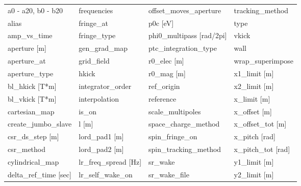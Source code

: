  \begin{tabular}{llll} \toprule
a0 - a20, b0 - b20               & frequencies                      & offset_moves_aperture            & tracking_method                  \\
alias                            & fringe_at                        & p0c [eV]                         & type                             \\
amp_vs_time                      & fringe_type                      & phi0_multipass [rad/2pi]         & vkick                            \\
aperture [m]                     & gen_grad_map                     & ptc_integration_type             & wall                             \\
aperture_at                      & grid_field                       & r0_elec [m]                      & wrap_superimpose                 \\
aperture_type                    & hkick                            & r0_mag [m]                       & x1_limit [m]                     \\
bl_hkick [T*m]                   & integrator_order                 & ref_origin                       & x2_limit [m]                     \\
bl_vkick [T*m]                   & interpolation                    & reference                        & x_limit [m]                      \\
cartesian_map                    & is_on                            & scale_multipoles                 & x_offset [m]                     \\
create_jumbo_slave               & l [m]                            & space_charge_method              & x_offset_tot [m]                 \\
csr_ds_step [m]                  & lord_pad1 [m]                    & spin_fringe_on                   & x_pitch [rad]                    \\
csr_method                       & lord_pad2 [m]                    & spin_tracking_method             & x_pitch_tot [rad]                \\
cylindrical_map                  & lr_freq_spread [Hz]              & sr_wake                          & y1_limit [m]                     \\
delta_ref_time [sec]             & lr_self_wake_on                  & sr_wake_file                     & y2_limit [m]                     \\

\end{tabular}
